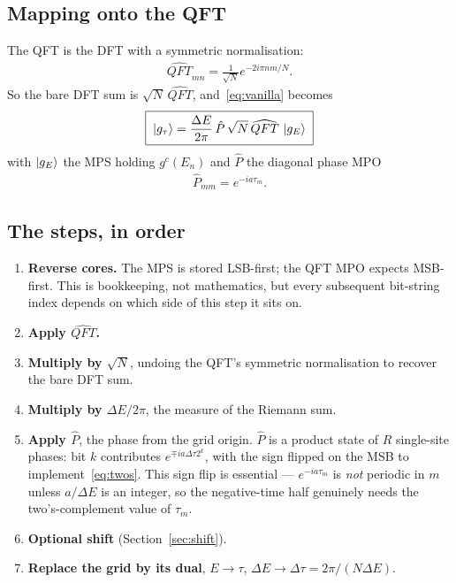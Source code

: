 \documentclass{article}
\begin{document}
	\subsection{Mapping onto the QFT}
	
	The QFT is the DFT with a symmetric normalisation:
	\begin{align}
		\widehat{QFT}_{mn} = \frac{1}{\sqrt{N}}e^{-2i\pi nm/N}.
	\end{align}
	So the bare DFT sum is $\sqrt{N}\,\widehat{QFT}$, and~\eqref{eq:vanilla} becomes
	\begin{align}
		\boxed{\;\ket{g_\tau} = \frac{\Delta E}{2\pi}\,\hat{P}\,\sqrt{N}\,
			\widehat{QFT}\,\ket{g_E}\;}
		\label{eq:vanilla_mps}
	\end{align}
	with $\ket{g_E}$ the MPS holding $g^c(E_n)$ and $\hat{P}$ the diagonal phase MPO
	\begin{align}
		\hat{P}_{mm} = e^{-ia\tau_m}.
	\end{align}
	
	\subsection{The steps, in order}
	
	\begin{enumerate}
		\item \textbf{Reverse cores.} The MPS is stored LSB-first; the QFT MPO
		expects MSB-first. This is bookkeeping, not mathematics, but every
		subsequent bit-string index depends on which side of this step it
		sits on.
		\item \textbf{Apply $\widehat{QFT}$.}
		\item \textbf{Multiply by $\sqrt{N}$}, undoing the QFT's symmetric
		normalisation to recover the bare DFT sum.
		\item \textbf{Multiply by $\Delta E/2\pi$}, the measure of the Riemann sum.
		\item \textbf{Apply $\hat{P}$}, the phase from the grid origin.
		$\hat{P}$ is a product state of $R$ single-site phases: bit $k$
		contributes $e^{\mp i a \Delta\tau 2^k}$, with the sign flipped on the
		MSB to implement~\eqref{eq:twos}. This sign flip is essential ---
		$e^{-ia\tau_m}$ is \emph{not} periodic in $m$ unless $a/\Delta E$ is an
		integer, so the negative-time half genuinely needs the two's-complement
		value of $\tau_m$.
		\item \textbf{Optional shift} (Section~\ref{sec:shift}).
		\item \textbf{Replace the grid by its dual}, $E\to\tau$,
		$\Delta E \to \Delta\tau = 2\pi/(N\Delta E)$.
	\end{enumerate}
	
\end{document}
